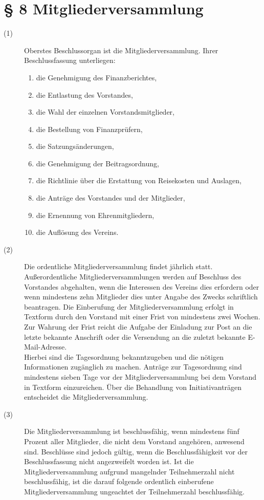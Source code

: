 \documentclass[12pt,paper=a4,ngerman]{scrreprt}
\begin{document}
\section{\S{} 8 Mitgliederversammlung}
\begin{description}
	\item[(1)] Oberstes Beschlussorgan ist die Mitgliederversammlung. Ihrer Beschlussfassung unterliegen:
	\begin{enumerate}
		\item die Genehmigung des Finanzberichtes,
		\item die Entlastung des Vorstandes,
		\item die Wahl der einzelnen Vorstandsmitglieder,
		\item die Bestellung von Finanzprüfern,
		\item die Satzungsänderungen,
		\item die Genehmigung der Beitragsordnung,
		\item die Richtlinie über die Erstattung von Reisekosten und Auslagen,
		\item die Anträge des Vorstandes und der Mitglieder,
		\item die Ernennung von Ehrenmitgliedern,
		\item die Auflösung des Vereins.
	\end{enumerate}
\item[(2)] Die ordentliche Mitgliederversammlung findet jährlich statt. Außerordentliche Mitgliederversammlungen werden auf Beschluss des Vorstandes abgehalten, wenn die Interessen des Vereins dies erfordern oder wenn mindestens zehn Mitglieder dies unter Angabe des Zwecks schriftlich beantragen. Die Einberufung der Mitgliederversammlung erfolgt in Textform durch den Vorstand mit einer Frist von mindestens zwei Wochen. Zur Wahrung der Frist reicht die Aufgabe der Einladung zur Post an die letzte bekannte Anschrift oder die Versendung an die zuletzt bekannte E-Mail-Adresse.\\
Hierbei sind die Tagesordnung bekanntzugeben und die nötigen Informationen zugänglich zu machen. Anträge zur Tagesordnung sind mindestens sieben Tage vor der Mitgliederversammlung bei dem Vorstand in Textform einzureichen. Über die Behandlung von Initiativanträgen entscheidet die Mitgliederversammlung.
\item[(3)] Die Mitgliederversammlung ist beschlussfähig, wenn mindestens fünf Prozent aller Mitglieder, die nicht dem Vorstand angehören, anwesend sind. Beschlüsse sind jedoch gültig, wenn die Beschlussfähigkeit vor der Beschlussfassung nicht angezweifelt worden ist. Ist die Mitgliederversammlung aufgrund mangelnder Teilnehmerzahl nicht beschlussfähig, ist die darauf folgende ordentlich einberufene Mitgliederversammlung ungeachtet der Teilnehmerzahl beschlussfähig.

\end{description}
\end{document}
